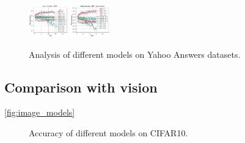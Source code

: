 \begin{figure}[htb!]
{    \includegraphics[width=0.15\textwidth]{figs/Dormancy/nlp/bert/yahoo_answers_40.pdf}
    \includegraphics[width=0.15\textwidth]{figs/Dormancy/nlp/bert_pretrained/yahoo_answers_40.pdf}
    }
    \caption{Analysis of different models on Yahoo Answers datasets.}
    \label{fig:yahoo_models_analysis}
\end{figure}



\subsection{Comparison with vision}

\autoref{fig:image_models}
\begin{figure}[t]
    \centering
    \caption{Accuracy of different models on CIFAR10.}
    \label{fig:image_models}
\end{figure}




